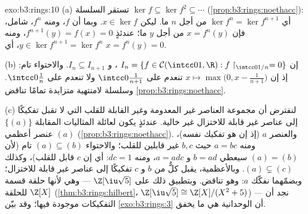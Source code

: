 \begin{solution}{exo:b3:rings:10}
(a) تستقر السلسلة $\ker f \subseteq \ker f^2 \subseteq \cdots$ (\cref{prop:b3:rings:noethacc}): أي $\ker f^n = \ker
f^{n+1}$ من أجل $n$
ما. ليكن $x \in \ker f$. وبما أن $f$، ومنه $f^n$، شامل، فإن
$x = f^n(y)$ من أجل $y$ ما؛ عندئذٍ $f^{n+1}(y) = f(x) =
0$، ومنه $y \in \ker f^{n+1} = \ker f^n$، أي
$x = f^n(y) = 0$.

(b) إن $I_n = \{f \in \mathcal C(\intcc01, \R) : f\restriction_{
\intcc0{1/n}} = 0\}$ ، و $I_n \subseteq I_{n+1}$. والاحتواء تام: إذ إن $x \mapsto \max\bigl(0, x -
\frac1{n+1}\bigr)$
تنعدم على $\intcc0{\frac1{n+1}}$ ولا تنعدم على $\intcc0{\frac1n}$. وسلسلة لامنتهية
متزايدة تمامًا تناقض \cref{prop:b3:rings:noethacc}.

(c) لنفترض أن مجموعة العناصر غير المعدومة وغير القابلة للقلب
التي لا تقبل تفكيكًا إلى عناصر غير قابلة للاختزال غير خالية.
عندئذٍ يكون لعائلة المثاليات المقابلة $\{(a)\}$ عنصر أعظمي $(a)$
(\cref{prop:b3:rings:noethacc}). والعنصر $a$  (إذ إن  هو تفكيك نفسه)، ومنه $a = bc$ حيث $b, c$ غير
قابلين للقلب؛ والاحتواء $(a) \subseteq (b)$ تام (لأن $(a) =
(b)$ سيعطي $b = ad$
و $a = adc$، ومنه $dc = 1$: أي إن $c$ قابل للقلب)، وكذلك
$(a) \subsetneq (c)$. وبالأعظمية، يقبل كلٌّ من $b$ و $c$ تفكيكًا إلى عناصر
غير قابلة للاختزال؛ وبضمّهما نفكّك $a$: وهو تناقض. وبتطبيق ذلك
على $\Z[\iu\sqrt5]$ --- وهي  لأنها حلقة قسمة للحلقة $\Z[X]$
(\cref{thm:b3:rings:hilbert}، $\Z[\iu\sqrt5]
\cong \Z[X]/(X^2+5)$) --- نجد أن التفكيكات موجودة فيها؛ وقد
بيّن \cref{exo:b3:rings:3} أن الوحدانية هي ما يخفق.
\end{solution}

